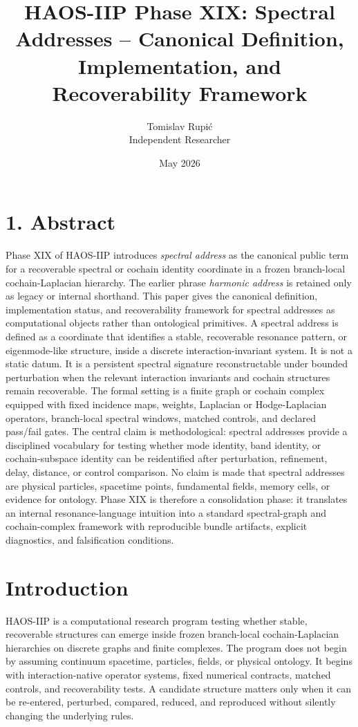 \documentclass[11pt]{article}
\title{HAOS-IIP Phase XIX: Spectral Addresses -- Canonical Definition, Implementation, and Recoverability Framework}
\author{Tomislav Rupi\'c \\ Independent Researcher}
\date{May 2026}
\begin{document}
\maketitle

\section*{1. Abstract}

Phase XIX of HAOS-IIP introduces \emph{spectral address} as the canonical public term for a recoverable spectral or cochain identity coordinate in a frozen branch-local cochain-Laplacian hierarchy. The earlier phrase \emph{harmonic address} is retained only as legacy or internal shorthand. This paper gives the canonical definition, implementation status, and recoverability framework for spectral addresses as computational objects rather than ontological primitives. A spectral address is defined as a coordinate that identifies a stable, recoverable resonance pattern, or eigenmode-like structure, inside a discrete interaction-invariant system. It is not a static datum. It is a persistent spectral signature reconstructable under bounded perturbation when the relevant interaction invariants and cochain structures remain recoverable. The formal setting is a finite graph or cochain complex equipped with fixed incidence maps, weights, Laplacian or Hodge-Laplacian operators, branch-local spectral windows, matched controls, and declared pass/fail gates. The central claim is methodological: spectral addresses provide a disciplined vocabulary for testing whether mode identity, band identity, or cochain-subspace identity can be reidentified after perturbation, refinement, delay, distance, or control comparison. No claim is made that spectral addresses are physical particles, spacetime points, fundamental fields, memory cells, or evidence for ontology. Phase XIX is therefore a consolidation phase: it translates an internal resonance-language intuition into a standard spectral-graph and cochain-complex framework with reproducible bundle artifacts, explicit diagnostics, and falsification conditions.

\tableofcontents

\setcounter{section}{1}

\section{Introduction}

HAOS-IIP is a computational research program testing whether stable, recoverable structures can emerge inside frozen branch-local cochain-Laplacian hierarchies on discrete graphs and finite complexes. The program does not begin by assuming continuum spacetime, particles, fields, or physical ontology. It begins with interaction-native operator systems, fixed numerical contracts, matched controls, and recoverability tests. A candidate structure matters only when it can be re-entered, perturbed, compared, reduced, and reproduced without silently changing the underlying rules.
\end{document}
